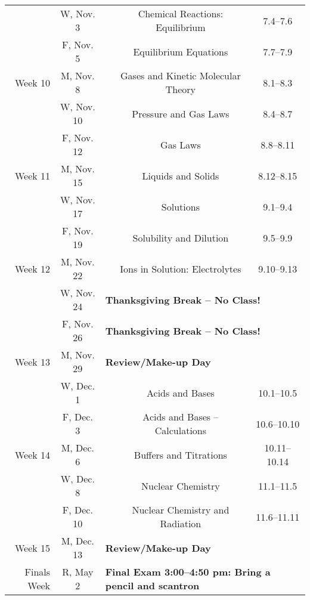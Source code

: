 \begin{tabular}{rcccc}
& W, Nov. 3&& Chemical Reactions: Equilibrium & 7.4--7.6\\
& F, Nov. 5&& Equilibrium Equations & 7.7--7.9\\
\midrule
Week 10 & M, Nov. 8&& Gases and Kinetic Molecular Theory & 8.1--8.3\\
& W, Nov. 10&& Pressure and Gas Laws & 8.4--8.7\\
& F, Nov. 12&& Gas Laws & 8.8--8.11\\
\midrule
Week 11 & M, Nov. 15&& Liquids and Solids & 8.12--8.15\\
& W, Nov. 17&& Solutions & 9.1--9.4\\
& F, Nov. 19&& Solubility and Dilution & 9.5--9.9\\
\midrule
Week 12 & M, Nov. 22&& Ions in Solution: Electrolytes & 9.10--9.13\\
& W, Nov. 24& \multicolumn{3}{l}{\textbf{Thanksgiving Break -- No Class!}}\\
& F, Nov. 26& \multicolumn{3}{l}{\textbf{Thanksgiving Break -- No Class!}}\\
\midrule
Week 13 & M, Nov. 29& \multicolumn{3}{l}{\textbf{Review/Make-up Day}}\\
& W, Dec. 1&& Acids and Bases & 10.1--10.5\\
& F, Dec. 3&& Acids and Bases -- Calculations & 10.6--10.10\\
\midrule
Week 14 & M, Dec. 6&& Buffers and Titrations & 10.11--10.14\\
& W, Dec. 8&& Nuclear Chemistry & 11.1--11.5\\
& F, Dec. 10&& Nuclear Chemistry and Radiation & 11.6--11.11\\
\midrule
Week 15 & M, Dec. 13& \multicolumn{3}{l}{\textbf{Review/Make-up Day}}\\
\midrule
Finals Week& R, May 2& \multicolumn{3}{l}{\textbf{Final Exam 3:00--4:50 pm: Bring a pencil and scantron}}\\
\end{tabular}